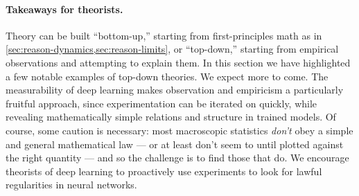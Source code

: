 \paragraph{Takeaways for theorists.} Theory can be built ``bottom-up,'' starting from first-principles math as in \cref{sec:reason-dynamics,sec:reason-limits}, or ``top-down,'' starting from empirical observations and attempting to explain them.
In this section we have highlighted a few notable examples of top-down theories.
We expect more to come.
The measurability of deep learning makes observation and empiricism a particularly fruitful approach, since experimentation can be iterated on quickly, while revealing mathematically simple relations and structure in trained models.
Of course, some caution is necessary: most macroscopic statistics \textit{don't} obey a simple and general mathematical law --- or at least don't seem to until plotted against the right quantity --- and so the challenge is to find those that do.
We encourage theorists of deep learning to proactively use experiments to look for lawful regularities in neural networks.
